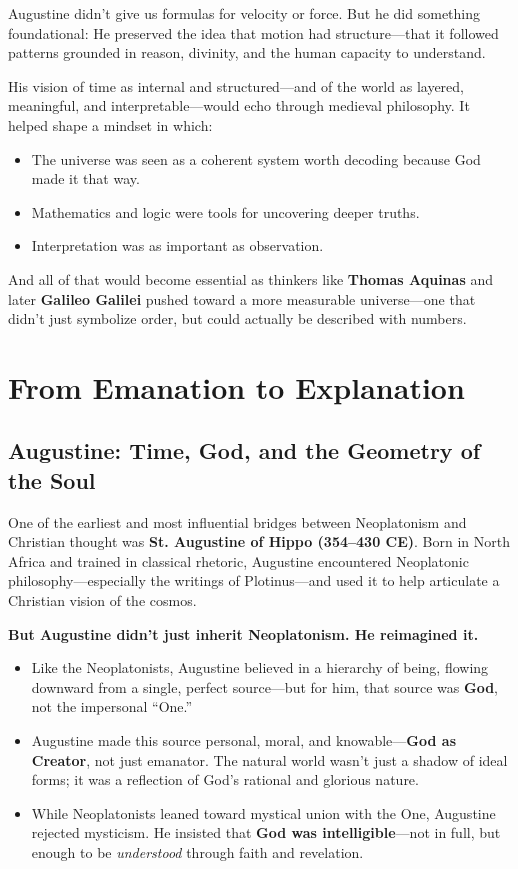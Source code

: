 Augustine didn’t give us formulas for velocity or force. But he did something foundational:  
He preserved the idea that motion had structure—that it followed patterns grounded in reason, divinity, and the human capacity to understand.

His vision of time as internal and structured—and of the world as layered, meaningful, and interpretable—would echo through medieval philosophy. It helped shape a mindset in which:

\begin{itemize}
    \item The universe was seen as a coherent system worth decoding because God made it that way.
    \item Mathematics and logic were tools for uncovering deeper truths.
    \item Interpretation was as important as observation.
\end{itemize}

And all of that would become essential as thinkers like \textbf{Thomas Aquinas} and later \textbf{Galileo Galilei} pushed toward a more measurable universe—one that didn’t just symbolize order, but could actually be described with numbers.


\section{From Emanation to Explanation}

\subsection{Augustine: Time, God, and the Geometry of the Soul}

One of the earliest and most influential bridges between Neoplatonism and Christian thought was \textbf{St. Augustine of Hippo (354–430 CE)}. Born in North Africa and trained in classical rhetoric, Augustine encountered Neoplatonic philosophy—especially the writings of Plotinus—and used it to help articulate a Christian vision of the cosmos.

\textbf{But Augustine didn’t just inherit Neoplatonism. He reimagined it.}

\begin{itemize}
  \item Like the Neoplatonists, Augustine believed in a hierarchy of being, flowing downward from a single, perfect source—but for him, that source was \textbf{God}, not the impersonal “One.”
  \item Augustine made this source personal, moral, and knowable—\textbf{God as Creator}, not just emanator. The natural world wasn’t just a shadow of ideal forms; it was a reflection of God’s rational and glorious nature.
  \item While Neoplatonists leaned toward mystical union with the One, Augustine rejected mysticism. He insisted that \textbf{God was intelligible}—not in full, but enough to be \emph{understood} through faith and revelation.
\end{itemize}


